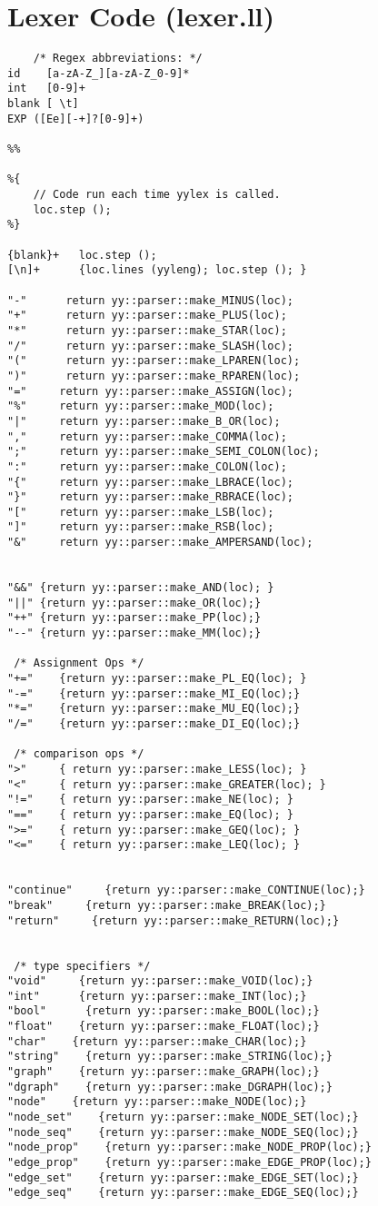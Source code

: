 \documentclass[english,a4paper,12pt]{report}
\begin{document}
\section{Lexer Code (lexer.ll)}
\begin{lstlisting}
    /* Regex abbreviations: */
id    [a-zA-Z_][a-zA-Z_0-9]*
int   [0-9]+
blank [ \t]
EXP	([Ee][-+]?[0-9]+)

%%

%{
    // Code run each time yylex is called.
    loc.step ();
%}

{blank}+   loc.step ();
[\n]+      {loc.lines (yyleng); loc.step (); }

"-"      return yy::parser::make_MINUS(loc);
"+"      return yy::parser::make_PLUS(loc);
"*"      return yy::parser::make_STAR(loc);
"/"      return yy::parser::make_SLASH(loc);
"("      return yy::parser::make_LPAREN(loc);
")"      return yy::parser::make_RPAREN(loc);
"="     return yy::parser::make_ASSIGN(loc);
"%"     return yy::parser::make_MOD(loc);
"|"     return yy::parser::make_B_OR(loc);
","     return yy::parser::make_COMMA(loc);
";"     return yy::parser::make_SEMI_COLON(loc);
":"     return yy::parser::make_COLON(loc);
"{"     return yy::parser::make_LBRACE(loc);
"}"     return yy::parser::make_RBRACE(loc);
"["     return yy::parser::make_LSB(loc);
"]"     return yy::parser::make_RSB(loc);
"&"     return yy::parser::make_AMPERSAND(loc);


"&&" {return yy::parser::make_AND(loc); }
"||" {return yy::parser::make_OR(loc);}
"++" {return yy::parser::make_PP(loc);}
"--" {return yy::parser::make_MM(loc);}

 /* Assignment Ops */
"+="    {return yy::parser::make_PL_EQ(loc); }
"-="    {return yy::parser::make_MI_EQ(loc);}
"*="    {return yy::parser::make_MU_EQ(loc);}
"/="    {return yy::parser::make_DI_EQ(loc);}

 /* comparison ops */
">"     { return yy::parser::make_LESS(loc); }
"<"     { return yy::parser::make_GREATER(loc); }
"!="    { return yy::parser::make_NE(loc); }
"=="    { return yy::parser::make_EQ(loc); }
">="    { return yy::parser::make_GEQ(loc); }
"<="    { return yy::parser::make_LEQ(loc); }


"continue"     {return yy::parser::make_CONTINUE(loc);}
"break"     {return yy::parser::make_BREAK(loc);}
"return"     {return yy::parser::make_RETURN(loc);}


 /* type specifiers */
"void"     {return yy::parser::make_VOID(loc);}
"int"      {return yy::parser::make_INT(loc);}
"bool"      {return yy::parser::make_BOOL(loc);}
"float"    {return yy::parser::make_FLOAT(loc);}
"char"    {return yy::parser::make_CHAR(loc);}
"string"    {return yy::parser::make_STRING(loc);}
"graph"    {return yy::parser::make_GRAPH(loc);}
"dgraph"    {return yy::parser::make_DGRAPH(loc);}
"node"    {return yy::parser::make_NODE(loc);}
"node_set"    {return yy::parser::make_NODE_SET(loc);}
"node_seq"    {return yy::parser::make_NODE_SEQ(loc);}
"node_prop"    {return yy::parser::make_NODE_PROP(loc);}
"edge_prop"    {return yy::parser::make_EDGE_PROP(loc);}
"edge_set"    {return yy::parser::make_EDGE_SET(loc);}
"edge_seq"    {return yy::parser::make_EDGE_SEQ(loc);}



\end{lstlisting}
\end{document}
